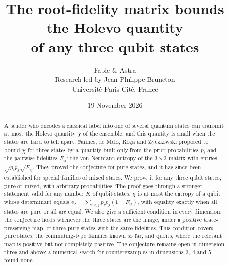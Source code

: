 \documentclass[11pt,a4paper]{article}
\title{The root-fidelity matrix bounds the Holevo quantity\\
of any three qubit states}
\author{Fable \& Astra\\[0.35em]
\normalsize Research led by Jean-Philippe Bruneton\\[-0.1em]
\small Universit\'e Paris Cit\'e, France}
\date{19 November 2026}
\theoremstyle{definition}
\theoremstyle{plain}
\begin{document}
\maketitle
\begin{abstract}
A sender who encodes a classical label into one of several quantum states can
transmit at most the Holevo quantity $\chi$ of the ensemble, and this quantity
is small when the states are hard to tell apart. Fannes, de Melo, Roga and
\.Zyczkowski proposed to bound $\chi$ for three states by a quantity built only
from the prior probabilities $p_i$ and the pairwise fidelities $F_{ij}$: the
von Neumann entropy of the $3\times3$ matrix with entries
$\sqrt{p_ip_j}\sqrt{F_{ij}}$. They proved the conjecture for pure states, and
it has since been established for special families of mixed states. We prove it
for any three qubit states, pure or mixed, with arbitrary probabilities. The
proof goes through a stronger statement valid for any number $K$ of qubit
states: $\chi$ is at most the entropy of a qubit whose determinant equals
$e_2=\sum_{i<j}p_ip_j(1-F_{ij})$, with equality exactly when all states are
pure or all are equal. We also give a sufficient condition in every dimension:
the conjecture holds whenever the three states are the image, under a positive
trace-preserving map, of three pure states with the same fidelities. This
condition covers pure states, the commuting-type families known so far, and
qubits, where the relevant map is positive but not completely positive. The
conjecture remains open in dimension three and above; a numerical search for
counterexamples in dimensions $3$, $4$ and $5$ found none.
\end{abstract}
\end{document}
